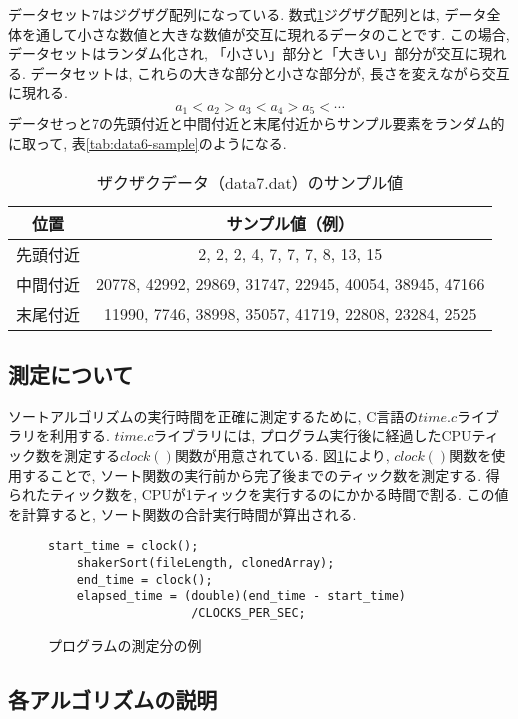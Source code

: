 \documentclass[a4j, 12pt]{jarticle}
\begin{document}
データセット7はジグザグ配列になっている. 数式\ref{tab:data7-sample}ジグザグ配列とは, データ全体を通して小さな数値と大きな数値が交互に現れるデータのことです. この場合, データセットはランダム化され, 「小さい」部分と「大きい」部分が交互に現れる. データセットは, これらの大きな部分と小さな部分が, 長さを変えながら交互に現れる. \\
\begin{equation}\label{zigzagsequence}
  a_1 < a_2 > a_3 < a_4 > a_5 < \cdots
\end{equation}
データせっと7の先頭付近と中間付近と末尾付近からサンプル要素をランダム的に取って, 表\ref{tab:data6-sample}のようになる. 
\begin{table}[H]
  \centering
  \caption{ザクザクデータ（data7.dat）のサンプル値}
  \begin{tabular}{|c|c|}
    \hline
    位置 & サンプル値（例） \\
    \hline
    先頭付近 & 2, 2, 2, 4, 7, 7, 7, 8, 13, 15 \\
    中間付近 & 20778, 42992, 29869, 31747, 22945, 40054, 38945, 47166 \\
    末尾付近 & 11990, 7746, 38998, 35057, 41719, 22808, 23284, 2525\\
    \hline
  \end{tabular}\label{tab:data7-sample}
\end{table}
\subsection{測定について}
ソートアルゴリズムの実行時間を正確に測定するために, C言語の$time.c$ライブラリを利用する. $time.c$ライブラリには, プログラム実行後に経過したCPUティック数を測定する$clock()$関数が用意されている. 図\ref{fig:clockcode}により, $clock()$関数を使用することで, ソート関数の実行前から完了後までのティック数を測定する. 得られたティック数を, CPUが1ティックを実行するのにかかる時間で割る. この値を計算すると, ソート関数の合計実行時間が算出される. 
\begin{figure}[htbp]
  \centering
  \caption{プログラムの測定分の例}\label{fig:clockcode}
  \begin{lstlisting}[basicstyle=\ttfamily\small]
    start_time = clock();
    shakerSort(fileLength, clonedArray);
    end_time = clock();
    elapsed_time = (double)(end_time - start_time)
                    /CLOCKS_PER_SEC;
  \end{lstlisting}
\end{figure}
\newpage
\subsection{各アルゴリズムの説明}
\end{document}
